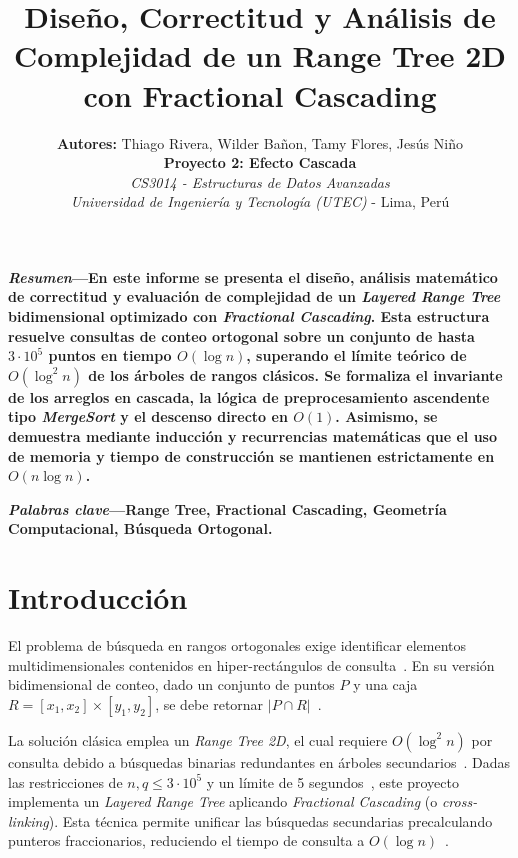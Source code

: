 \documentclass[10pt,twocolumn,a4paper]{article}
\begin{document}
\title{\vspace{-0.9cm}\textbf{\Large Diseño, Correctitud y Análisis de Complejidad de un Range Tree 2D con Fractional Cascading}}

\author{
    \textbf{Autores:} Thiago Rivera, Wilder Bañon, Tamy Flores, Jesús Niño \\
    \textbf{Proyecto 2: Efecto Cascada} \\
    \textit{CS3014 - Estructuras de Datos Avanzadas} \\
    \textit{Universidad de Ingeniería y Tecnología (UTEC)} - Lima, Perú \\
}
\date{}
\maketitle

\noindent\small\textbf{\textit{Resumen}---En este informe se presenta el diseño, análisis matemático de correctitud y evaluación de complejidad de un \textit{Layered Range Tree} bidimensional optimizado con \textit{Fractional Cascading}. Esta estructura resuelve consultas de conteo ortogonal sobre un conjunto de hasta $3 \cdot 10^5$ puntos en tiempo $O(\log n)$, superando el límite teórico de $O(\log^2 n)$ de los árboles de rangos clásicos. Se formaliza el invariante de los arreglos en cascada, la lógica de preprocesamiento ascendente tipo \textit{MergeSort} y el descenso directo en $O(1)$. Asimismo, se demuestra mediante inducción y recurrencias matemáticas que el uso de memoria y tiempo de construcción se mantienen estrictamente en $O(n \log n)$.}

\vspace{0.4em}
\noindent\small\textbf{\textit{Palabras clave}---Range Tree, Fractional Cascading, Geometría Computacional, Búsqueda Ortogonal.}

\vspace{0.5em}

\section{Introducción}
El problema de búsqueda en rangos ortogonales exige identificar elementos multidimensionales contenidos en hiper-rectángulos de consulta~\cite{deberg}. En su versión bidimensional de conteo, dado un conjunto de puntos $P$ y una caja $R = [x_1, x_2] \times [y_1, y_2]$, se debe retornar $|P \cap R|$~\cite{doc}. 

La solución clásica emplea un \textit{Range Tree 2D}, el cual requiere $O(\log^2 n)$ por consulta debido a búsquedas binarias redundantes en árboles secundarios~\cite{deberg}. Dadas las restricciones de $n, q \le 3 \cdot 10^5$ y un límite de 5 segundos~\cite{doc}, este proyecto implementa un \textit{Layered Range Tree} aplicando \textit{Fractional Cascading} (o \textit{cross-linking}). Esta técnica permite unificar las búsquedas secundarias precalculando punteros fraccionarios, reduciendo el tiempo de consulta a $O(\log n)$~\cite{deberg}.
\end{document}

